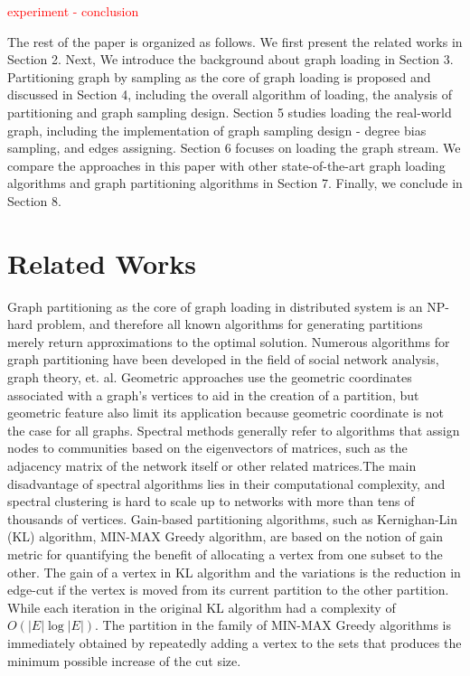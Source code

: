 \documentclass{sig-alternate-2013}
\begin{document}
\textcolor{red}{experiment - conclusion}

The rest of the paper is organized as follows. We first present the related works in Section 2. Next, We introduce the background about graph loading in Section 3. Partitioning graph by sampling as the core of graph loading is proposed and discussed in Section 4, including the overall algorithm of loading, the analysis of partitioning and graph sampling design. Section 5 studies loading the real-world graph, including the implementation of graph sampling design - degree bias sampling, and edges assigning. Section 6 focuses on loading the graph stream. We compare the approaches in this paper with other state-of-the-art graph loading algorithms and graph partitioning algorithms in Section 7. Finally, we conclude in Section 8.

\section{Related Works}

Graph partitioning as the core of graph loading in distributed system is an NP-hard problem, and therefore all known algorithms for generating partitions merely return approximations to the optimal solution. Numerous algorithms for graph partitioning have been developed in the field of social network analysis, graph theory, et. al. Geometric approaches use the geometric coordinates associated with a graph's vertices to aid in the creation of a partition, but geometric feature also limit its application because geometric coordinate is not the case for all graphs. Spectral methods generally refer to algorithms that assign nodes to communities based on the eigenvectors of matrices, such as the adjacency matrix of the network itself or other related matrices\cite{Luxburg:spectralcluster}.The main disadvantage of spectral algorithms lies in their computational complexity, and spectral clustering is hard to scale up to networks with more than tens of thousands of vertices. Gain-based partitioning algorithms, such as Kernighan-Lin (KL) algorithm\cite{Fiduccia:klvar, Kernighan:kl}, MIN-MAX Greedy algorithm\cite{Battiti:minmaxgreedy, Laguna:greedy}, are based on the notion of gain metric for quantifying the benefit of allocating a vertex from one subset to the other. The gain of a vertex in KL algorithm and the variations is the reduction in edge-cut if the vertex is moved from its current partition to the other partition. While each iteration in the original KL algorithm had a complexity of $O(|E|\log{|E|})$. The partition in the family of MIN-MAX Greedy algorithms is immediately obtained by repeatedly adding a vertex to the sets that produces the minimum possible increase of the cut size.
\end{document}
